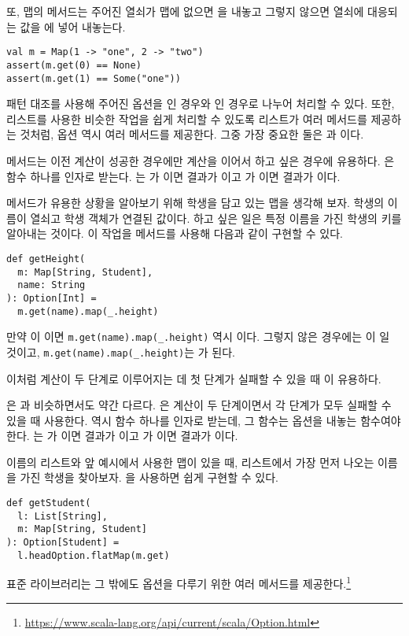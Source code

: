 또, 맵의  메서드는 주어진 열쇠가 맵에 없으면 을 내놓고
그렇지 않으면 열쇠에 대응되는 값을 에 넣어 내놓는다.

\begin{verbatim}
val m = Map(1 -> "one", 2 -> "two")
assert(m.get(0) == None)
assert(m.get(1) == Some("one"))
\end{verbatim}

패턴 대조를 사용해 주어진 옵션을 인 경우와 인 경우로
나누어 처리할 수 있다. 또한, 리스트를 사용한 비슷한 작업을 쉽게 처리할 수 있도록
리스트가 여러 메서드를 제공하는 것처럼, 옵션 역시 여러 메서드를 제공한다. 그중
가장 중요한 둘은 과 이다.

 메서드는 이전 계산이 성공한 경우에만 계산을 이어서 하고 싶은 경우에
유용하다. 은 함수 하나를 인자로 받는다. 는
가 이면 결과가 이고 가
이면 결과가 이다.

 메서드가 유용한 상황을 알아보기 위해 학생을 담고 있는 맵을 생각해
보자. 학생의 이름이 열쇠고 학생 객체가 연결된 값이다. 하고 싶은 일은 특정 이름을
가진 학생의 키를 알아내는 것이다. 이 작업을  메서드를 사용해 다음과 같이 구현할 수 있다.

\begin{verbatim}
def getHeight(
  m: Map[String, Student],
  name: String
): Option[Int] =
  m.get(name).map(_.height)
\end{verbatim}

만약 이 이면 \verb!m.get(name).map(_.height)! 역시
이다. 그렇지 않은 경우에는 이
일 것이고, \verb!m.get(name).map(_.height)!는
가 된다.

이처럼 계산이 두 단계로 이루어지는 데 첫 단계가 실패할 수 있을 때 이 유용하다.

은 과 비슷하면서도 약간 다르다. 은 계산이
두 단계이면서 각 단계가 모두 실패할 수 있을 때 사용한다.  역시
함수 하나를 인자로 받는데, 그 함수는 옵션을 내놓는 함수여야 한다.
는 가 이면 결과가 이고
가 이면 결과가 이다.

이름의 리스트와 앞 예시에서 사용한 맵이 있을 때, 리스트에서 가장 먼저 나오는
이름을 가진 학생을 찾아보자. 을 사용하면 쉽게 구현할 수 있다.

\begin{verbatim}
def getStudent(
  l: List[String],
  m: Map[String, Student]
): Option[Student] =
  l.headOption.flatMap(m.get)
\end{verbatim}

표준 라이브러리는 그 밖에도 옵션을 다루기 위한 여러 메서드를
제공한다.\footnote{\url{https://www.scala-lang.org/api/current/scala/Option.html}}
